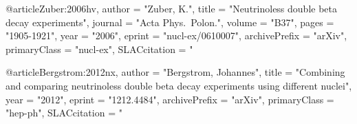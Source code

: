@article{Zuber:2006hv,
      author         = "Zuber, K.",
      title          = "{Neutrinoless double beta decay experiments}",
      journal        = "Acta Phys.\ Polon.",
      volume         = "B37",
      pages          = "1905-1921",
      year           = "2006",
      eprint         = "nucl-ex/0610007",
      archivePrefix  = "arXiv",
      primaryClass   = "nucl-ex",
      SLACcitation   = "%
}

@article{Bergstrom:2012nx,
      author         = "Bergstrom, Johannes",
      title          = "{Combining and comparing neutrinoless double beta decay
                        experiments using different nuclei}",
      year           = "2012",
      eprint         = "1212.4484",
      archivePrefix  = "arXiv",
      primaryClass   = "hep-ph",
      SLACcitation   = "%
}


